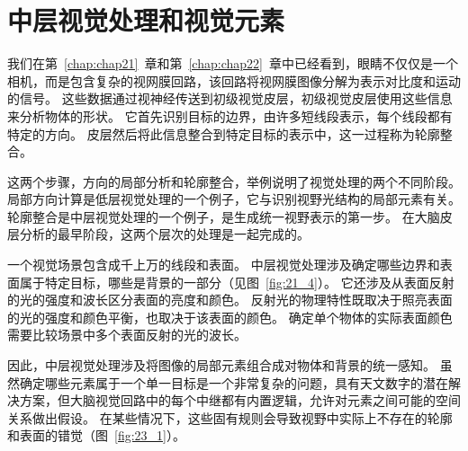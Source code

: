 \chapter{中层视觉处理和视觉元素} \label{chap:chap23}

我们在第~\ref{chap:chap21}~章和第~\ref{chap:chap22}~章中已经看到，眼睛不仅仅是一个相机，而是包含复杂的视网膜回路，该回路将视网膜图像分解为表示对比度和运动的信号。
这些数据通过视神经传送到初级视觉皮层，初级视觉皮层使用这些信息来分析物体的形状。
它首先识别目标的边界，由许多短线段表示，每个线段都有特定的方向。
皮层然后将此信息整合到特定目标的表示中，这一过程称为轮廓整合。


这两个步骤，方向的局部分析和轮廓整合，举例说明了视觉处理的两个不同阶段。
局部方向计算是低层视觉处理的一个例子，它与识别视野光结构的局部元素有关。
轮廓整合是中层视觉处理的一个例子，是生成统一视野表示的第一步。
在大脑皮层分析的最早阶段，这两个层次的处理是一起完成的。


一个视觉场景包含成千上万的线段和表面。
中层视觉处理涉及确定哪些边界和表面属于特定目标，哪些是背景的一部分（见图~\ref{fig:21_4}）。
它还涉及从表面反射的光的强度和波长区分表面的亮度和颜色。
反射光的物理特性既取决于照亮表面的光的强度和颜色平衡，也取决于该表面的颜色。
确定单个物体的实际表面颜色需要比较场景中多个表面反射的光的波长。


因此，中层视觉处理涉及将图像的局部元素组合成对物体和背景的统一感知。
虽然确定哪些元素属于一个单一目标是一个非常复杂的问题，具有天文数字的潜在解决方案，但大脑视觉回路中的每个中继都有内置逻辑，允许对元素之间可能的空间关系做出假设。
在某些情况下，这些固有规则会导致视野中实际上不存在的轮廓和表面的错觉（图~\ref{fig:23_1}）。



